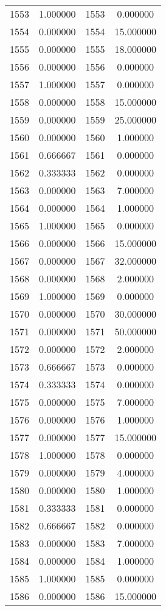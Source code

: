 \documentclass[12pt]{article}
\begin{document}
\begin{longtable}{@{}cccc@{}}
1553 & 1.000000 & 1553 & 0.000000 \\
1554 & 0.000000 & 1554 & 15.000000 \\
1555 & 0.000000 & 1555 & 18.000000 \\
1556 & 0.000000 & 1556 & 0.000000 \\
1557 & 1.000000 & 1557 & 0.000000 \\
1558 & 0.000000 & 1558 & 15.000000 \\
1559 & 0.000000 & 1559 & 25.000000 \\
1560 & 0.000000 & 1560 & 1.000000 \\
1561 & 0.666667 & 1561 & 0.000000 \\
1562 & 0.333333 & 1562 & 0.000000 \\
1563 & 0.000000 & 1563 & 7.000000 \\
1564 & 0.000000 & 1564 & 1.000000 \\
1565 & 1.000000 & 1565 & 0.000000 \\
1566 & 0.000000 & 1566 & 15.000000 \\
1567 & 0.000000 & 1567 & 32.000000 \\
1568 & 0.000000 & 1568 & 2.000000 \\
1569 & 1.000000 & 1569 & 0.000000 \\
1570 & 0.000000 & 1570 & 30.000000 \\
1571 & 0.000000 & 1571 & 50.000000 \\
1572 & 0.000000 & 1572 & 2.000000 \\
1573 & 0.666667 & 1573 & 0.000000 \\
1574 & 0.333333 & 1574 & 0.000000 \\
1575 & 0.000000 & 1575 & 7.000000 \\
1576 & 0.000000 & 1576 & 1.000000 \\
1577 & 0.000000 & 1577 & 15.000000 \\
1578 & 1.000000 & 1578 & 0.000000 \\
1579 & 0.000000 & 1579 & 4.000000 \\
1580 & 0.000000 & 1580 & 1.000000 \\
1581 & 0.333333 & 1581 & 0.000000 \\
1582 & 0.666667 & 1582 & 0.000000 \\
1583 & 0.000000 & 1583 & 7.000000 \\
1584 & 0.000000 & 1584 & 1.000000 \\
1585 & 1.000000 & 1585 & 0.000000 \\
1586 & 0.000000 & 1586 & 15.000000 \\

\end{longtable}
\end{document}
